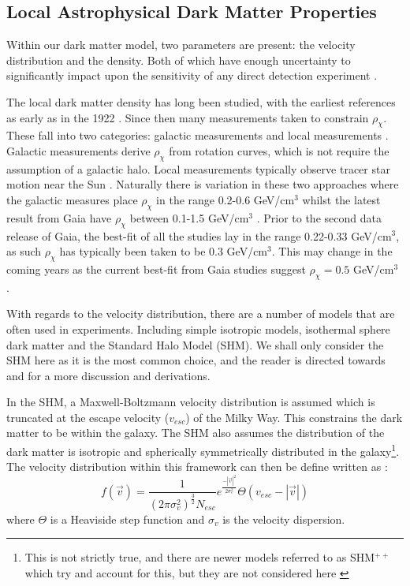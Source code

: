 \subsection{Local Astrophysical Dark Matter Properties}
\par
Within our dark matter model, two parameters are present: the velocity distribution and the density.
Both of which have enough uncertainty to significantly impact upon the sensitivity of any direct detection experiment \cite{local_dm_uncertainties_ref}.
\par
The local dark matter density has long been studied, with the earliest references as early as in the 1922 \cite{first_dm_density_1_ref, first_dm_density_2_ref}.
Since then many measurements taken to constrain $\rho_{\chi}$.
These fall into two categories: galactic measurements and local measurements \cite{dm_density_ref}.
Galactic measurements derive $\rho_{\chi}$ from rotation curves, which is not require the assumption of a galactic halo.
Local measurements typically observe tracer star motion near the Sun \cite{gaia_tracer_dm_density_ref}.
Naturally there is variation in these two approaches where the galactic measures place $\rho_{\chi}$ in the range 0.2-0.6 GeV/cm$^3$ whilst the latest result from Gaia \cite{gaia_data_2_ref} have $\rho_{\chi}$ between 0.1-1.5 GeV/cm$^3$ \cite{gaia_dm_density_2_ref}.
Prior to the second data release of Gaia, the best-fit of all the studies lay in the range 0.22-0.33 GeV/cm$^3$, as such $\rho_{\chi}$ has typically been taken to be 0.3 GeV/cm$^3$.
This may change in the coming years as the current best-fit from Gaia studies suggest $\rho_{\chi}=0.5$ GeV/cm$^{3}$ \cite{gaia_dm_density_1_ref}.
\par
With regards to the velocity distribution, there are a number of models that are often used in experiments.
Including simple isotropic models, isothermal sphere dark matter and the Standard Halo Model (SHM).
We shall only consider the SHM here as it is the most common choice, and the reader is directed towards \cite{dm_velocity_isothermal_ref} and \cite{dm_velocity_shm_ref} for a more  discussion and derivations.
\par
In the SHM, a Maxwell-Boltzmann velocity distribution is assumed which is truncated at the escape velocity ($v_{esc}$) of the Milky Way.
This constrains the dark matter to be within the galaxy.
The SHM also assumes the distribution of the dark matter is isotropic and spherically symmetrically distributed in the galaxy\footnote{This is not strictly true, and there are newer models referred to as SHM$^{++}$ which try and account for this, but they are not considered here \cite{extended_shm_ref}}.
The velocity distribution within this framework can then be define written as \cite{shm_derivation_ref}:
\begin{equation}
 f(\vec{v}) = \frac{1}{(2\pi\sigma^2_{v})^{\frac{3}{2}}N_{esc}} e^{\frac{- |\vec{v}|^2}{2\sigma^2_v}} \Theta(v_{esc} - |\vec{v}|)
\label{eq:shm_velocity_1}
\end{equation}
where $\Theta$ is a Heaviside step function and $\sigma_v$ is the velocity dispersion.

